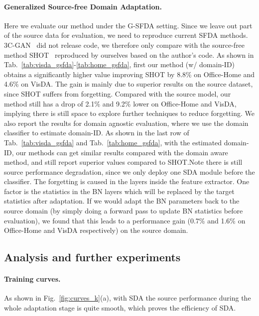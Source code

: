\documentclass[10pt,twocolumn,letterpaper]{article}
\begin{document}
\paragraph{Generalized Source-free Domain Adaptation.}
Here we evaluate our method under the G-SFDA setting. Since we leave out part of the source data for evaluation, we need to reproduce current SFDA methods. 3C-GAN~\cite{li2020model} did not release code, we therefore only compare with the source-free method SHOT~\cite{liang2020we} reproduced by ourselves based on the author's code.
As shown in Tab.~\ref{tab:visda_gsfda}-\ref{tab:home_gsfda}, first our method (w/ domain-ID) obtains a significantly higher  value improving SHOT by 8.8\% on Office-Home and 4.6\% on VisDA. The gain is mainly due to superior results on the source dataset, since SHOT suffers from forgetting. Compared with the source model, our method still has a drop of 2.1\% and 9.2\% lower on Office-Home and VisDA, implying there is still space to explore further techniques to reduce forgetting. 
We also report the results for domain agnostic evaluation, where we use the domain classifier to estimate domain-ID. As shown in the last row of Tab.~\ref{tab:visda_gsfda} and Tab.~\ref{tab:home_gsfda}, with the estimated domain-ID, our methods can get similar results compared with the domain aware method, and still report superior  values compared to SHOT.{Note there is still source performance degradation, since we only deploy one SDA module before the classifier. The forgetting is caused in the layers inside the feature extractor.
One factor is the statistics in the BN layers which will be replaced by the target statistics after adaptation. If we would adapt the BN parameters back to the source domain (by simply doing a forward pass to update BN statistics before evaluation), we found that this leads to a performance gain (0.7\% and 1.6\% on Office-Home and VisDA respectively) on the source domain.}




\subsection{Analysis and further experiments}

\paragraph{Training curves.} As shown in Fig.~\ref{fig:curves_k}(a), with SDA the source performance during the whole adaptation stage is quite smooth, which proves the efficiency of SDA.
\end{document}
